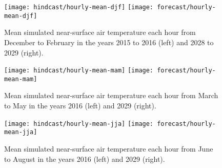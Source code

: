 

	\begin{figure}	
		\centering
		\texttt{[image: hindcast/hourly-mean-djf]}		
		\texttt{[image: forecast/hourly-mean-djf]}		
		\caption{
			Mean simulated near-surface air temperature each hour from December to February in the years 2015 to 2016 (left) and 2028 to 2029 (right).
		}
		\label{fig:hourly-mean-djf}
	\end{figure}
	
	\begin{figure}	
		\centering
		\texttt{[image: hindcast/hourly-mean-mam]}		
		\texttt{[image: forecast/hourly-mean-mam]}		
		\caption{
			Mean simulated near-surface air temperature each hour from March to May in the years 2016 (left) and 2029 (right).
		}
		\label{fig:hourly-mean-mam}
	\end{figure}
	
	\begin{figure}	
		\centering
		\texttt{[image: hindcast/hourly-mean-jja]}		
		\texttt{[image: forecast/hourly-mean-jja]}		
		\caption{
			Mean simulated near-surface air temperature each hour from June to August in the years 2016 (left) and 2029 (right).
		}
		\label{fig:hourly-mean-jja}
	\end{figure}	
	
